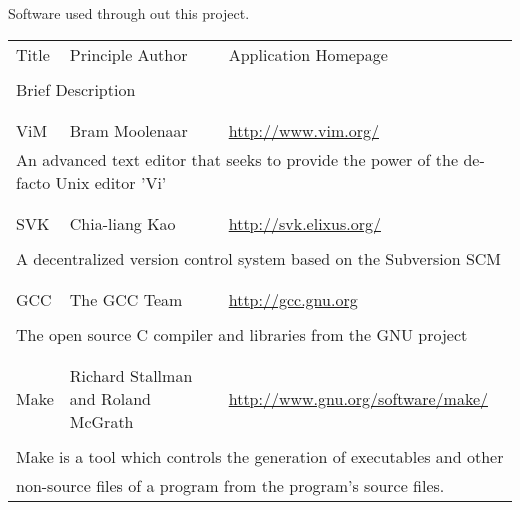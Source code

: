 \documentclass[a4paper,12pt]{article}
\begin{document}
Software used through out this project. 

\begin{tabular}{llll}
Title	&	Principle Author	&	Application Homepage	& 	\\
	&	&	&	\\
\multicolumn{4}{l}{Brief Description}		\\
	&	&	&	\\
	&	&	&	\\
ViM	&	Bram Moolenaar	&	\url{http://www.vim.org/}	&	\\	
\multicolumn{4}{l}{An advanced text editor that seeks to provide the power of the de-facto Unix editor 'Vi'}	\\
	&	&	&	\\
	&	&	&	\\
SVK	&	Chia-liang Kao	&	\url{http://svk.elixus.org/}	&	\\
	&	&	&	\\
\multicolumn{4}{l}{A decentralized version control system based on the Subversion SCM} \\
	&	&	&	\\
	&	&	&	\\
GCC	&	The GCC Team	&	\url{http://gcc.gnu.org}	&	\\
	&	&	&	\\
\multicolumn{4}{l}{The open source C compiler and libraries from the GNU project} \\
	&	&	&	\\
	&	&	&	\\
Make	& Richard Stallman and Roland McGrath	&
\url{http://www.gnu.org/software/make/}	&	\\
	&	&	&	\\
\multicolumn{4}{l}{Make is a tool which controls the generation of executables and other} \\ 
\multicolumn{4}{l}{non-source files of a program from the program's source files.} \\
\end{tabular}
\end{document}
